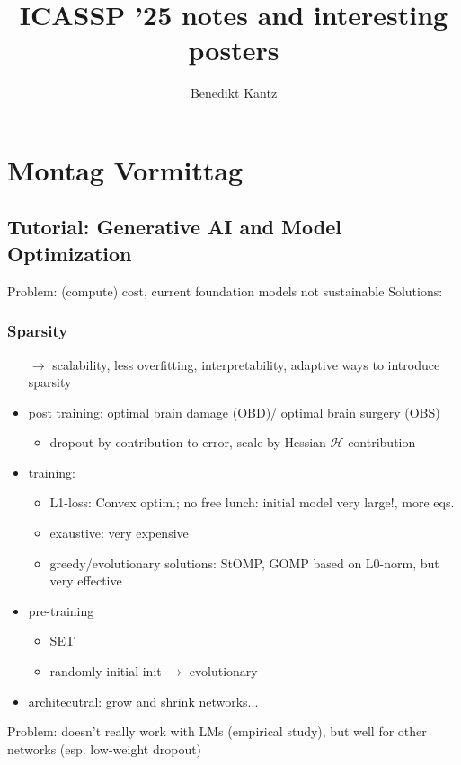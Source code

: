 \documentclass[a4paper]{article}
\title{ICASSP '25 notes and interesting posters}
\author{Benedikt Kantz}
\begin{document}
\maketitle

\section{Montag Vormittag}
\subsection{Tutorial: Generative AI and Model Optimization}
Problem: (compute) cost, current foundation models not sustainable
Solutions:
\subsubsection{Sparsity}
\begin{itemize}
    \item[$\rightarrow$] scalability, less overfitting, interpretability, adaptive ways to introduce sparsity
    \item post training: optimal brain damage (OBD)/ optimal brain surgery (OBS)
          \begin{itemize}
              \item dropout by contribution to error, scale by Hessian $\mathcal{H}$ contribution

          \end{itemize}
    \item training:
          \begin{itemize}
              \item L1-loss: Convex optim.; no free lunch: initial model very large!, more eqs.
              \item exaustive: very expensive
              \item greedy/evolutionary solutions: StOMP, GOMP based on L0-norm, but very effective
          \end{itemize}
    \item pre-training
          \begin{itemize}
              \item SET
              \item randomly initial init $\rightarrow$ evolutionary
          \end{itemize}
    \item architecutral: grow and shrink networks...
\end{itemize}
Problem: doesn't really work with LMs (empirical study), but well for other networks (esp. low-weight dropout)
\end{document}
